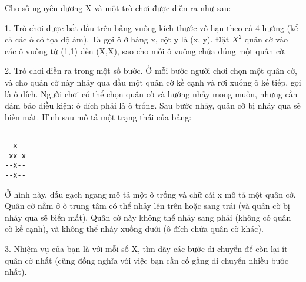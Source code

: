 Cho số nguyên dương X và một trò chơi được diễn ra như sau:   

   1. Trò chơi được bắt đầu trên bảng vuông kích thước vô hạn theo cả 4 hướng (kể cả các ô có tọa độ âm). Ta gọi ô ở hàng x, cột y là (x, y). Đặt $X^{2}$   quân cờ vào các ô vuông từ (1,1) đến (X,X), sao cho mỗi ô vuông chứa đúng một quân cờ.  

   2. Trò chơi diễn ra trong một số bước. Ở mỗi bước người chơi chọn một quân cờ, và cho quân cờ này nhảy qua đầu một quân cờ kề cạnh và rơi xuống ô kế tiếp, gọi là ô đích. Người chơi có thể chọn quân cờ và hướng nhảy mong muốn, nhưng cần đảm bảo điều kiện: ô đích phải là ô trống. Sau bước nhảy, quân cờ bị nhảy qua sẽ biến mất. Hình sau mô tả một trạng thái của bảng:  
\begin{verbatim}
-----
--x--
-xx-x
--x--
--x--\end{verbatim}

   Ở hình này, dấu gạch ngang mô tả một ô trống và chữ cái x mô tả một quân cờ. Quân cờ nằm ở ô trung tâm có thể nhảy lên trên hoặc sang trái (và quân cờ bị nhảy qua sẽ biến mất). Quân cờ này không thể nhảy sang phải (không có quân cờ kề cạnh), và không thể nhảy xuống dưới (ô đích chứa quân cờ khác).  

   3. Nhiệm vụ của bạn là với mỗi số X, tìm dãy các bước di chuyển để còn lại ít quân cờ nhất (cũng đồng nghĩa với việc bạn cần cố gắng di chuyển nhiều bước nhất).